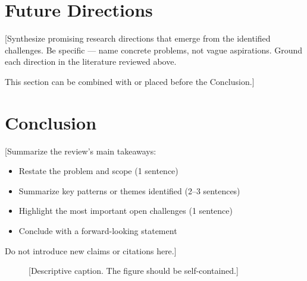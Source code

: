 \documentclass[conference]{IEEEtran}
\begin{document}
\section{Future Directions}
[Synthesize promising research directions that emerge from the identified
challenges. Be specific — name concrete problems, not vague aspirations.
Ground each direction in the literature reviewed above.

This section can be combined with or placed before the Conclusion.]

\section{Conclusion}
[Summarize the review's main takeaways:
\begin{itemize}
    \item Restate the problem and scope (1 sentence)
    \item Summarize key patterns or themes identified (2–3 sentences)
    \item Highlight the most important open challenges (1 sentence)
    \item Conclude with a forward-looking statement
\end{itemize}

Do not introduce new claims or citations here.]

\begin{figure}[t]
    \centering
    \caption{[Descriptive caption. The figure should be self-contained.]}
    \label{fig:example}
\end{figure}



% 


\end{document}
